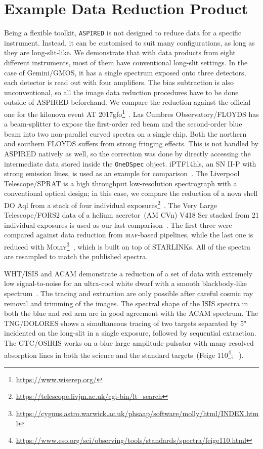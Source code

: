 \documentclass[linenumbers, twocolumn]{aastex631}
\begin{document}
\section{Example Data Reduction Product}
\label{sec:examples}
Being a flexible toolkit, \texttt{ASPIRED} is not designed to reduce data for a
specific instrument. Instead, it can be customised to suit many configurations,
as long as they are long-slit-like. We demonstrate that with data products
from eight different instruments, most of them have conventional long-slit
settings. In the case of Gemini/GMOS, it has a single spectrum exposed onto
three detectors, each detector is read out with four amplifiers. The bias 
subtraction is also unconventional, so all the image data reduction procedures
have to be done outside of ASPIRED beforehand. We compare the reduction against
the official one for the kilonova event AT 2017gfo\footnote{\url{https://www.wiserep.org/}}~\citep{2017ApJ...848L..32M}. Las Cumbres
Observatory/FLOYDS has a beam-splitter to expose
the first-order red beam and the second-order blue beam into two non-parallel
curved spectra on a single chip. Both the northern and southern FLOYDS suffers
from strong fringing effects. This is not handled by ASPIRED natively as well,
so the correction was done by directly accessing the intermediate data stored
inside the \texttt{OneDSpec} object. iPTF14hls, an SN II-P with strong emission
lines, is used as an example for comparison~\citep{2017Natur.551..210A}. The
Liverpool Telescope/SPRAT is a high throughput low-resolution spectrograph with
a conventional optical design; in this case, we compare the reduction of a nova 
shell DO Aql from a stack of four individual 
exposures\footnote{\url{https://telescope.livjm.ac.uk/cgi-bin/lt_search}}~\citep{2020MNRAS.499.2959H}. The Very Large Telescope/FORS2 data
of a helium accretor~(AM CVn) V418 Ser stacked from 21 individual exposures is
used as our last comparison~\citep{2020MNRAS.496.1243G}. The first three were 
compared against data reduction from \textsc{iraf}-based pipelines, while the
last one is reduced with \textsc{Molly}\footnote{
\url{https://cygnus.astro.warwick.ac.uk/phsaap/software/molly/html/INDEX.html}}~\citep{2019ascl.soft07012M},
which is built on top of STARLINKs. All of the spectra are resampled to match
the published spectra.

WHT/ISIS and ACAM demonstrate a reduction of a set of data with extremely low
signal-to-noise for an ultra-cool white dwarf with a smooth blackbody-like
spectrum~\citep{2020MNRAS.493.6001L}. The tracing and extraction are only
possible after careful cosmic ray removal and trimming of the images. The
spectral shape of the ISIS spectra in both the blue and red arm are in good
agreement with the ACAM spectrum. The TNG/DOLORES shows a simultaneous tracing
of two targets separated by 5" incidented on the long-slit in a single exposure,
followed by sequential extraction. The GTC/OSIRIS works on a blue large
amplitude pulsator with many resolved absorption lines in both the science and
the standard targets~(Feige 110\footnote{
\url{https://www.eso.org/sci/observing/tools/standards/spectra/feige110.html}}; ~\citealp{2022MNRAS.511.4971M}). 
\end{document}
